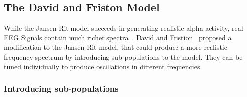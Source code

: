
\pagebreak

\subsection{The David and Friston Model}\label{subsec:the-david-and-friston-model}

While the Jansen-Rit model succeeds in generating realistic alpha activity,
real EEG Signals contain much richer spectra~\parencite{steriade_impact_2001}.
David and Fristion~\cite{david_neural_2003} proposed a modification to the Jansen-Rit model,
that could produce a more realistic frequency spectrum by introducing sub-populations to the model.
They can be tuned individually to produce oscillations in different frequencies.

\subsubsection{Introducing sub-populations}

